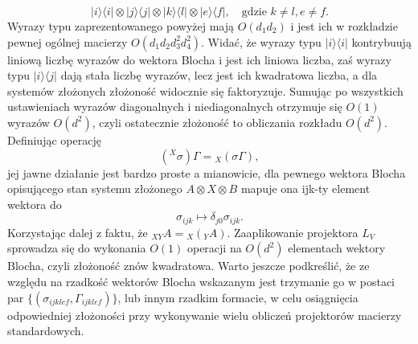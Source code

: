 \documentclass[10pt]{article} %
\newcommand{\Ket}[1]{|#1\rangle}
\newcommand{\Bra}[1]{\langle#1|}
\begin{document}
\begin{appendices}
\begin{equation}
\Ket{i}\Bra{i} \otimes \Ket{j}\Bra{j} \otimes \Ket{k}\Bra{l} \otimes \Ket{e}\Bra{f}, \quad \text{gdzie }k \neq l, e \neq f.
\end{equation} Wyrazy typu zaprezentowanego powyżej mają $O(d_1d_2)$ i jest ich w rozkładzie pewnej ogólnej macierzy $O(d_1d_2d_3^2d_4^2)$. Widać, że wyrazy typu $\Ket{i}\Bra{i}$ kontrybuują liniową liczbę wyrazów do wektora Blocha i jest ich liniowa liczba, zaś wyrazy typu $\Ket{i}\Bra{j}$ dają stała liczbę wyrazów, lecz jest ich kwadratowa liczba, a dla systemów złożonych złożoność widocznie się faktoryzuje. Sumując po wszystkich ustawieniach wyrazów diagonalnych i niediagonalnych otrzymuje się $O(1)$ wyrazów $O(d^2)$, czyli ostatecznie złożoność to obliczania rozkładu $O(d^2)$.
Definiując operację
\begin{equation}
({}^X\sigma) \Gamma = {}_X(\sigma\Gamma),
\end{equation} jej jawne działanie jest bardzo proste a mianowicie, dla pewnego wektora Blocha opisującego stan systemu złożonego $A \otimes X \otimes B$ mapuje ona ijk-ty element wektora do
\begin{equation}
\sigma_{ijk} \mapsto \delta_{j0}\sigma_{ijk}.
\end{equation}
Korzystając dalej z faktu, że ${}_{XY}A = {}_X({}_Y A)$. Zaaplikowanie projektora $L_V$ sprowadza się do wykonania $O(1)$ operacji na $O(d^2)$ elementach wektory Blocha, czyli złożoność znów kwadratowa.
Warto jeszcze podkreślić, że ze względu na rzadkość wektorów Blocha wskazanym jest trzymanie go w postaci par $\{ (\sigma_{ijklef}, \Gamma_{ijklef}) \}$, lub innym rzadkim formacie, w celu osiągnięcia odpowiedniej złożoności przy wykonywanie wielu obliczeń projektorów macierzy standardowych.

\end{appendices}
\end{document}
